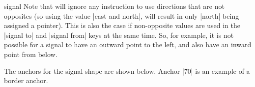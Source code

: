 \begin{shape}{signal}
    Note that \pgfname{} will ignore any instruction to use directions that are
    not opposites (so using the value |east and north|, will result in only
    |north| being assigned a pointer). This is also the case if non-opposite
    values are used in the |signal to| and |signal from| keys at the same time.
    So, for example, it is not possible for a signal to have an outward point
    to the left, and also have an inward point from below.

    The anchors for the signal shape are shown below. Anchor |70| is an example
    of a border anchor.
\begin{codeexample}[preamble={\usetikzlibrary{shapes.symbols}}]
\Huge
{}
\end{codeexample}
\end{shape}


